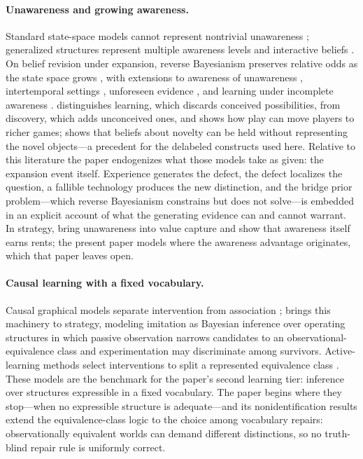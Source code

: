 \documentclass[11pt]{article}
\theoremstyle{definition}
\begin{document}
\paragraph{Unawareness and growing awareness.}
Standard state-space models cannot represent nontrivial unawareness \citep{DekelLipmanRustichini1998}; generalized structures represent multiple awareness levels and interactive beliefs \citep{HeifetzMeierSchipper2006,HeifetzMeierSchipper2013}.
On belief revision under expansion, reverse Bayesianism preserves relative odds as the state space grows \citep{KarniViero2013}, with extensions to awareness of unawareness \citep{KarniViero2017}, intertemporal settings \citep{Viero2021}, unforeseen evidence \citep{Piermont2021}, and learning under incomplete awareness \citep{GrantMeneghelTourky2022}.
\citet{Schipper2021} distinguishes learning, which discards conceived possibilities, from discovery, which adds unconceived ones, and shows how play can move players to richer games; \citet{Schipper2025} shows that beliefs about novelty can be held without representing the novel objects---a precedent for the delabeled constructs used here.
Relative to this literature the paper endogenizes what those models take as given: the expansion event itself.
Experience generates the defect, the defect localizes the question, a fallible technology produces the new distinction, and the bridge prior problem---which reverse Bayesianism constrains but does not solve---is embedded in an explicit account of what the generating evidence can and cannot warrant.
In strategy, \citet{BryanRyallSchipper2022} bring unawareness into value capture and show that awareness itself earns rents; the present paper models where the awareness advantage originates, which that paper leaves open.

\paragraph{Causal learning with a fixed vocabulary.}
Causal graphical models separate intervention from association \citep{Pearl2009,SpirtesEtAl2000}; \citet{Ryall2009} brings this machinery to strategy, modeling imitation as Bayesian inference over operating structures in which passive observation narrows candidates to an observational-equivalence class and experimentation may discriminate among survivors.
Active-learning methods select interventions to split a represented equivalence class \citep{HeGeng2008}.
These models are the benchmark for the paper's second learning tier: inference over structures expressible in a fixed vocabulary.
The paper begins where they stop---when no expressible structure is adequate---and its nonidentification results extend the equivalence-class logic to the choice among vocabulary repairs: observationally equivalent worlds can demand different distinctions, so no truth-blind repair rule is uniformly correct.
\end{document}
